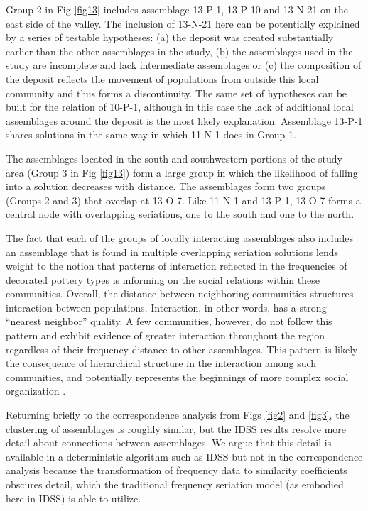 \documentclass[10pt,letterpaper]{article}
\begin{document}
Group 2 in Fig \ref{fig13} includes assemblage 13-P-1, 13-P-10 and 13-N-21 on the east side of the valley. The inclusion of 13-N-21 here can be potentially explained by a series of testable hypotheses: (a) the deposit was created substantially earlier than the other assemblages in the study, (b) the assemblages used in the study are incomplete and lack intermediate assemblages or (c) the composition of the deposit reflects the movement of populations from outside this local community and thus forms a discontinuity. The same set of hypotheses can be built for the relation of 10-P-1, although in this case the lack of additional local assemblages around the deposit is the most likely explanation. Assemblage 13-P-1 shares solutions in the same way in which 11-N-1 does in Group 1. 

The assemblages located in the south and southwestern portions of the study area (Group 3 in Fig \ref{fig13}) form a large group in which the likelihood of falling into a solution decreases with distance. The assemblages form two groups (Groups 2 and 3) that overlap at 13-O-7. Like 11-N-1 and 13-P-1, 13-O-7 forms a central node with overlapping seriations, one to the south and one to the north. 

The fact that each of the groups of locally interacting assemblages also includes an assemblage that is found in multiple overlapping seriation solutions lends weight to the notion that patterns of interaction reflected in the frequencies of decorated pottery types is informing on the social relations within these communities. Overall, the distance between neighboring communities structures interaction between populations. Interaction, in other words, has a strong “nearest neighbor” quality. A few communities, however, do not follow this pattern and exhibit evidence of greater interaction throughout the region regardless of their frequency distance to other assemblages. This pattern is likely the consequence of hierarchical structure in the interaction among such communities, and potentially represents the beginnings of more complex social organization \cite{Lipo2001a,Lipo2008}. 

Returning briefly to the correspondence analysis from Figs \ref{fig2} and \ref{fig3}, the clustering of assemblages is roughly similar, but the IDSS results resolve more detail about connections between assemblages. We argue that this detail is available in a deterministic algorithm such as IDSS but not in the correspondence analysis because the transformation of frequency data to similarity coefficients obscures detail, which the traditional frequency seriation model (as embodied here in IDSS) is able to utilize. 
\end{document}
